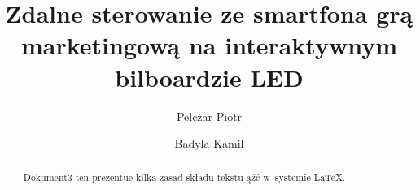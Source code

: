 \documentclass[11pt,a4paper]{article}
\title{Zdalne sterowanie ze smartfona grą marketingową na interaktywnym bilboardzie LED}
\author{
  Pelczar Piotr\\
  \and
  Badyla Kamil\\
}
\date{}
\begin{document}
\maketitle 

\begin{abstract} 
Dokument3 ten prezentue kilka zasad składu tekstu ąźć
w~systemie \LaTeX. 
\end{abstract} 

\tableofcontents
\listoftables






\listoffigures
\end{document}
